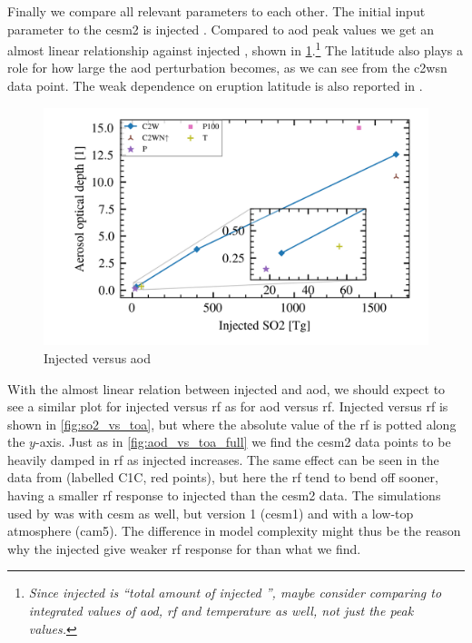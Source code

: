 \documentclass{ametsocV5}
\newcommand{\iso}[1][i]{{#1}njected \ce{SO2}}
\begin{document}
Finally we compare all relevant parameters to each other. The initial input parameter to
the \ac{cesm2} is injected . Compared to \ac{aod} peak values we get an almost
linear relationship against \iso{}, shown in \cref{fig:so2_vs_aod}.\footnote{\emph{Since
    \iso{} is ``total amount of \iso{}'', maybe consider comparing to integrated values of
    \ac{aod}, \ac{rf} and temperature as well, not just the peak values.}} The latitude also
plays a role for how large the \ac{aod} perturbation becomes, as we can see from the
\ac{c2wsn} data point. The weak dependence on eruption latitude is also reported in
\citet{marshall2019}.

\begin{figure}[t]
  \begin{center}
    \includegraphics[width=0.95\linewidth]{figures/injection_vs_aod.png}
  \end{center}
  \caption{Injected  versus \ac{aod}}%
  \label{fig:so2_vs_aod}
\end{figure}

With the almost linear relation between injected  and \ac{aod}, we should expect
to see a similar plot for \iso{} versus \ac{rf} as for \ac{aod} versus \ac{rf}. \iso[I]
versus \ac{rf} is shown in \cref{fig:so2_vs_toa}, but where the absolute value of the
\ac{rf} is potted along the \( y \)-axis. Just as in \cref{fig:aod_vs_toa_full} we find
the \ac{cesm2} data points to be heavily damped in \ac{rf} as \iso{} increases. The same
effect can be seen in the data from \citet{ottobliesner2016} (labelled C1C, red points),
but here the \ac{rf} tend to bend off sooner, having a smaller \ac{rf} response to
\iso{} than the \ac{cesm2} data. The simulations used by \citet{ottobliesner2016} was
with \ac{cesm} as well, but version 1 (\ac{cesm1}) and with a low-top atmosphere
(\ac{cam5}). The difference in model complexity might thus be the reason why the \iso{}
give weaker \ac{rf} response for \citet{ottobliesner2016} than what we find.
\end{document}
